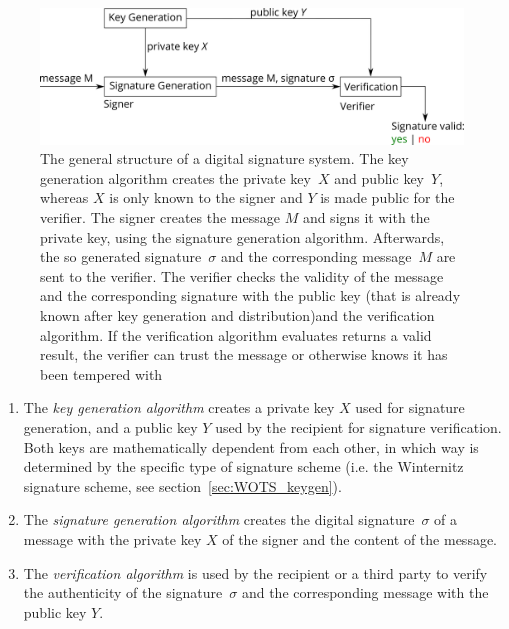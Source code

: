 \begin{figure}
\centering
\includegraphics[width=\linewidth]{images/Background/Digital_Signaturesystem_Simple.png}
\caption{The general structure of a digital signature system. The key generation algorithm creates the private key~$X$ and public key~$Y$, whereas $X$ is only known to the signer and $Y$ is made public for the verifier. The signer creates the message $M$ and signs it with the private key, using the signature generation algorithm. Afterwards, the so generated signature~$\sigma$ and the corresponding message~$M$ are sent to the verifier. The verifier checks the validity of the message and the corresponding signature with the public key (that is already known after key generation and distribution)and the verification algorithm. If the verification algorithm evaluates returns a valid result, the verifier can trust the message or otherwise knows it has been tempered with}
\label{img:digital_sign_system_simple}
\end{figure} 

\begin{enumerate}
\item The \textit{key generation algorithm} creates a private key $X$ used for signature generation, and a public key $Y$ used by the recipient for signature verification. Both keys are mathematically dependent from each other, in which way is determined by the specific type of signature scheme (i.e. the Winternitz signature scheme, see section~\ref{sec:WOTS_keygen}). %
\item The \textit{signature generation algorithm} creates the digital signature~$\sigma$ of a message with the private key $X$ of the signer and the content of the message.
\item The \textit{verification algorithm} is used by the recipient or a third party to verify the authenticity of the signature~$\sigma$ and the corresponding message with the public key $Y$.
\end{enumerate}

